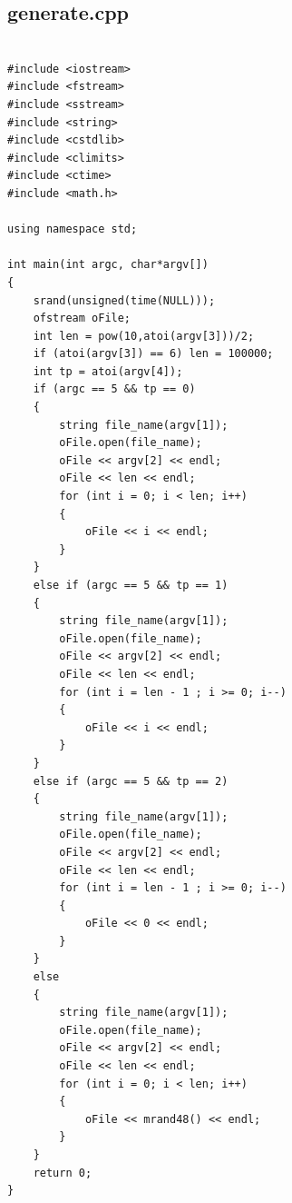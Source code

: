\documentclass{article}
\begin{document}
\subsection{generate.cpp}
\begin{lstlisting}[title=generate.cpp, frame=shadowbox]

#include <iostream>
#include <fstream>
#include <sstream>
#include <string>
#include <cstdlib>
#include <climits>
#include <ctime>
#include <math.h>

using namespace std;

int main(int argc, char*argv[])
{
    srand(unsigned(time(NULL)));
    ofstream oFile;
    int len = pow(10,atoi(argv[3]))/2;
    if (atoi(argv[3]) == 6) len = 100000;
    int tp = atoi(argv[4]);
    if (argc == 5 && tp == 0)
    {
        string file_name(argv[1]);
        oFile.open(file_name);
        oFile << argv[2] << endl;
        oFile << len << endl;
        for (int i = 0; i < len; i++)
        {
            oFile << i << endl;
        }
    }
    else if (argc == 5 && tp == 1)
    {
        string file_name(argv[1]);
        oFile.open(file_name);
        oFile << argv[2] << endl;
        oFile << len << endl;
        for (int i = len - 1 ; i >= 0; i--)
        {
            oFile << i << endl;
        }
    }
    else if (argc == 5 && tp == 2)
    {
        string file_name(argv[1]);
        oFile.open(file_name);
        oFile << argv[2] << endl;
        oFile << len << endl;
        for (int i = len - 1 ; i >= 0; i--)
        {
            oFile << 0 << endl;
        }
    }
    else 
    {
        string file_name(argv[1]);
        oFile.open(file_name);
        oFile << argv[2] << endl;
        oFile << len << endl;
        for (int i = 0; i < len; i++)
        {
            oFile << mrand48() << endl;
        }
    }
    return 0;    
}
\end{lstlisting}
\end{document}
